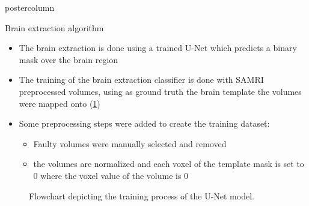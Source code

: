 \begin{frame}
\begin{columns}
\begin{column}{.42\textwidth}
\begin{beamercolorbox}[center]{postercolumn}
\begin{minipage}{.98\textwidth}
{%
                            \begin{myblock}{Brain extraction algorithm}
                                \begin{itemize}
                                    \item The brain extraction is done using a trained U-Net \cite{ronneberger_u-net:_2015} which predicts a binary mask over the brain region
                                    \item The training of the brain extraction classifier is done with \textcolor{lg}{SAMRI} preprocessed volumes, using as ground truth the brain template the volumes were mapped onto (\cref{training_graph})
                                    \item Some preprocessing steps were added to create the training dataset:
                                    \begin{itemize}
                                        \item Faulty volumes were manually selected and removed
                                        \item the volumes are normalized and each voxel of the template mask is set to 0 where the voxel value of the volume is 0
                                    \end{itemize}
                                \end{itemize}

                                \begin{figure}
                                    \centering
                                    \caption{Flowchart depicting the training process of the U-Net model.}
                                    \label{training_graph}
                                \end{figure}


\end{myblock}}
\end{minipage}
\end{beamercolorbox}
\end{column}
\end{columns}
\end{frame}
